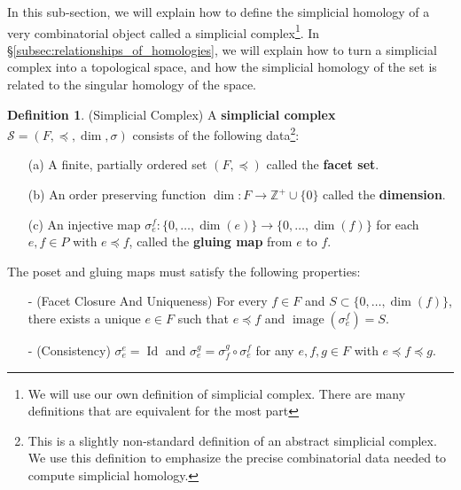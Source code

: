 \documentclass[12pt]{article}
\theoremstyle{definition}
\newtheorem{definition}[theorem]{Definition}
\numberwithin{equation}{section}
\newcommand{\Z}{{\mathbb Z}}
\newcommand{\op}{\operatorname}
\begin{document}
In this sub-section, we will explain how to define the simplicial homology of a very combinatorial object called a simplicial complex\footnote{We will use our own definition of simplicial complex. There are many definitions that are equivalent for the most part}. In \S \ref{subsec:relationships_of_homologies}, we will explain how to turn a simplicial complex into a topological space, and how the simplicial homology of the set is related to the singular homology of the space.

\begin{definition} \label{def:simplicial_complex} (Simplicial Complex) A {\bf simplicial complex} $\mathcal{S} = (F,\preccurlyeq,\op{dim},\sigma)$ consists of the following data\footnote{This is a slightly non-standard definition of an abstract simplicial complex. We use this definition to emphasize the precise combinatorial data needed to compute simplicial homology.}:
\begin{enumerate}
	\item[(a)] A finite, partially ordered set $(F,\preccurlyeq)$ called the {\bf facet set}.
	\item[(b)] An order preserving function $\op{dim}:F \to \Z^+ \cup \{0\}$ called the {\bf dimension}.
	\item[(c)] An injective map $\sigma^f_e:\{0,\dots,\op{dim}(e)\} \to \{0,\dots,\op{dim}(f)\}$ for each $e,f \in P$ with $e \preccurlyeq f$, called the {\bf gluing map} from $e$ to $f$.
\end{enumerate}
The poset and gluing maps must satisfy the following properties:
\begin{enumerate}
\item[-] (Facet Closure And Uniqueness) For every $f \in F$ and $S \subset \{0,\dots,\op{dim}(f)\}$, there exists a unique $e \in F$ such that $e \preccurlyeq f$ and $\op{image}(\sigma^f_e) = S$.
\item[-] (Consistency) $\sigma^e_e = \op{Id}$ and $\sigma^g_e = \sigma^g_f \circ \sigma^f_e$ for any $e,f,g \in F$ with $e \preccurlyeq f \preccurlyeq g$.
\end{enumerate} 
\end{definition}
\end{document}

